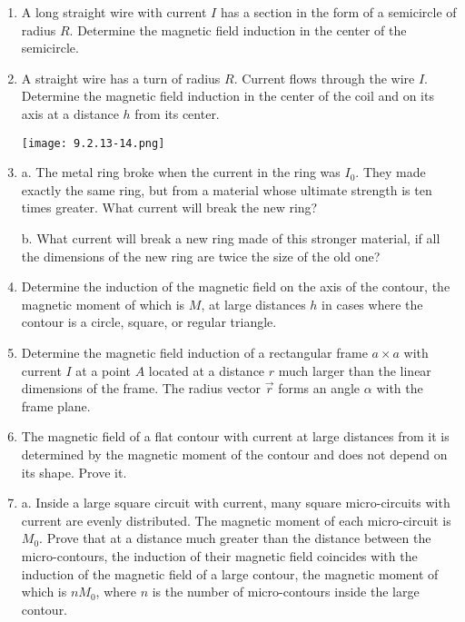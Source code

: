 \documentclass{article}
\begin{document}
\begin{enumerate}[label=9.2.\arabic*]
\item A long straight wire with current $I$ has a section in the form of a semicircle of radius $R$. Determine the magnetic field induction in the center of the semicircle.

\item A straight wire has a turn of radius $R$. Current flows through the wire $I$. Determine the magnetic field induction in the center of the coil and on its axis at a distance $h$ from its center.

\begin{center}
    \texttt{[image: 9.2.13-14.png]}
\end{center}

\item a. The metal ring broke when the current in the ring was $I_0$. They made exactly the same ring, but from a material whose ultimate strength is ten times greater. What current will break the new ring? 

b. What current will break a new ring made of this stronger material, if all the dimensions of the new ring are twice the size of the old one?

\item Determine the induction of the magnetic field on the axis of the contour, the magnetic moment of which is $M$, at large distances $h$ in cases where the contour is a circle, square, or regular triangle.

\item Determine the magnetic field induction of a rectangular frame $a \times a$ with current $I$ at a point $A$ located at a distance $r$ much larger than the linear dimensions of the frame. The radius vector $\overrightarrow{r}$ forms an angle $\alpha$ with the frame plane.

\item The magnetic field of a flat contour with current at large distances from it is determined by the magnetic moment of the contour and does not depend on its shape. Prove it.

\item a. Inside a large square circuit with current, many square micro-circuits with current are evenly distributed. The magnetic moment of each micro-circuit is $M_0$. Prove that at a distance much greater than the distance between the micro-contours, the induction of their magnetic field coincides with the induction of the magnetic field of a large contour, the magnetic moment of which is $nM_0$, where $n$ is the number of micro-contours inside the large contour. 


\end{enumerate}
\end{document}
